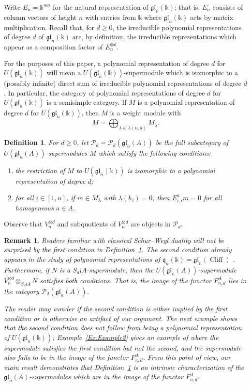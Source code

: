 \documentclass[11pt,reqno]{amsart} %
\newtheorem{definition}[theorem]{Definition}
\newtheorem{remark}[theorem]{Remark}
\newcommand{\gl}{\mathfrak{gl}}
\renewcommand{\k}{\mathds{k}}
\newcommand{\0}{\bar{0}}
\newcommand{\1}{\bar{1}}
\newcommand{\wreath}{\wr}
\newcommand{\SdwreathA}{S_{d} \wreath A}
\newcommand{\Cliff}{\operatorname{Cliff}}
\newcommand{\Pol}{\mathcal{P}}
\newcommand{\fq}{\mathfrak{q}}
\numberwithin{equation}{subsection}
\begin{document}
Write $E_{n} = \k^{\oplus n}$ for the natural representation of $\gl_{n}(\k)$; that is, $E_{n}$ consists of column vectors of height $n$ with entries from $\k$ where $\gl_{n}(\k)$ acts by matrix multiplication.  Recall that, for $d \geq 0$, the irreducible polynomial representations of degree $d$ of $\gl_{n}(\k )$ are, by definition, the irreducible representations which appear as a composition factor of $E_{n}^{\otimes d}$.  

For the purposes of this paper, a polynomial representation of degree $d$ for $U(\gl_{n}(\k))$ will mean a $U(\gl_{n}(\k ))$-supermodule which is isomorphic to a (possibly infinite) direct sum of irreducible polynomial representations of degree $d$.  In particular, the category of polynomial representations of degree $d$ for $U(\gl_{n}(\k ))$ is a semisimple category.  If $M$ is a polynomial representation of degree $d$ for $U(\gl_{n}(\k))$, then $M$ is a weight module with 
\[
M = \bigoplus_{\lambda \in \Lambda(n,d)} M_{\lambda}.
\]


\begin{definition}\label{D:polynomial}  For $d \geq 0$, let $\Pol_{d} = \Pol_{d}(\gl_{n}(A))$ be the full subcategory of $U(\gl_{n}(A))$-supermodules $M$ which satisfy the following conditions:
\begin{enumerate}
\item the restriction of $M$ to $U(\gl_{n}(\k ))$ is isomorphic to a polynomial representation of degree $d$;
\item for all $i \in [1,n]$, if $m \in M_{\lambda}$ with $\lambda (h_{i}) =0$, then $E_{i,i}^{a}m =0$ for all homogeneous $a \in A$.
\end{enumerate}  
\end{definition} \noindent   Observe that $V_{n}^{\otimes d}$ and subquotients of $V_{n}^{\otimes d}$ are objects in $\Pol_{d}$.

\begin{remark} Readers familiar with classical Schur--Weyl duality will not be surprised by the first condition in Definition~\ref{D:polynomial}. The second condition already appears in the study of polynomial representations of $\fq_{n}(\k) = \gl_{n}(\Cliff)$ \cite[Definition 1.5]{GJKK}. Furthermore, if $N$ is a $\SdwreathA$-supermodule, then the $U(\gl_{n}(A))$-supermodule $V_{n}^{\otimes d} \otimes_{\SdwreathA} N$ satisfies both conditions.  That is, the image of the functor $F_{n,d}^{A}$ lies in the category $\Pol_{d}(\gl_{n}(A))$.    

The reader may wonder if the second condition is either implied by the first condition or is otherwise an artifact of our argument. The next example shows that the second condition does not follow from being a polynomial representation of $U(\gl_{n}(\k ))$; Example~\ref{Ex:Example2} gives an example of where the supermodule satisfies the first condition but not the second, and the supermodule also fails to be in the image of the functor $F_{n,d}^{A}$. From this point of view, our main result demonstrates that Definition~\ref{D:polynomial} is an intrinsic characterization of the $\gl_{n}(A)$-supermodules which are in the image of the functor $F_{n,d}^{A}$. 
\end{remark}
\end{document}

